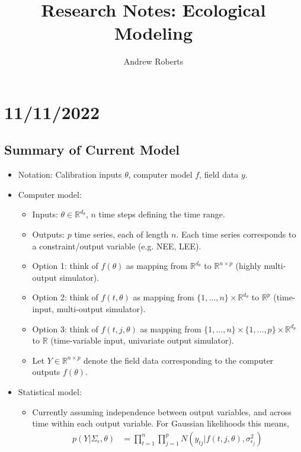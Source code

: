 \documentclass[12pt]{article}
\title{Research Notes: Ecological Modeling}
\author{Andrew Roberts}
\newcommand{\R}{\mathbb{R}}
\begin{document}
\maketitle
\tableofcontents
\newpage

\section{11/11/2022}

\subsection{Summary of Current Model}
\begin{itemize}
\item Notation: Calibration inputs $\theta$, computer model $f$, field data $y$.
\item Computer model: 
	\begin{itemize}
	\item Inputs: $\theta \in \R^{d_\theta}$, $n$ time steps defining the time range. 
	\item Outputs: $p$ time series, each of length $n$. Each time series corresponds to a constraint/output variable (e.g. NEE, LEE). 
	\item Option 1: think of $f(\theta)$ as mapping from $\R^{d_\theta}$ to $\R^{n \times p}$ (highly multi-output simulator).
	\item Option 2: think of $f(t, \theta)$ as mapping from $\{1, \dots, n\} \times \R^{d_\theta}$ to $\R^p$ (time-input, multi-output simulator).
	\item Option 3: think of $f(t, j, \theta)$ as mapping from $\{1, \dots, n\} \times \{1, \dots, p\} \times \R^{d_\theta}$ to $\R$ (time-variable input, univariate output simulator). 
	\item Let $Y \in \R^{n \times p}$ denote the field data corresponding to the computer outputs $f(\theta)$.
	\end{itemize}
\item Statistical model:
	\begin{itemize}
	\item Currently assuming independence between output variables, and across time within each output variable. For Gaussian likelihoods this means,
		\begin{align}
		p(Y|\Sigma_\epsilon, \theta) &= \prod_{t = 1}^{n} \prod_{j = 1}^{p} N(y_{tj}|f(t, j, \theta), \sigma^2_{\epsilon_j}) \label{ind_lik}
		\end{align}
	\end{itemize}

\end{itemize}
\end{document}
